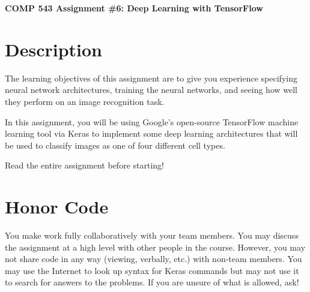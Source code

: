 \documentclass[11pt]{article}
\renewcommand\:{\colon} %
\begin{document}

\begin{center}
{\bf \huge{COMP 543 Assignment \#6: Deep Learning with TensorFlow}}
\end{center}


\section*{Description}
The learning objectives of this assignment are to give you experience specifying neural network architectures, training the neural networks,  and seeing how well they perform on an image recognition task.

In this assignment, you will be using Google's open-source TensorFlow machine learning tool via Keras to implement
some deep learning architectures that will be used to classify images as one of four different cell types. 

Read the entire assignment before starting! 



\section*{Honor Code}

You make work fully collaboratively with your team members. You may discuss the assignment at a high level with other people in the course. However, you may not share code in any way (viewing, verbally, etc.) with non-team members.  You may use the Internet to look up syntax for Keras commands but may not use it to search for answers to the problems. If you are unsure of what is allowed, ask!
\end{document}
